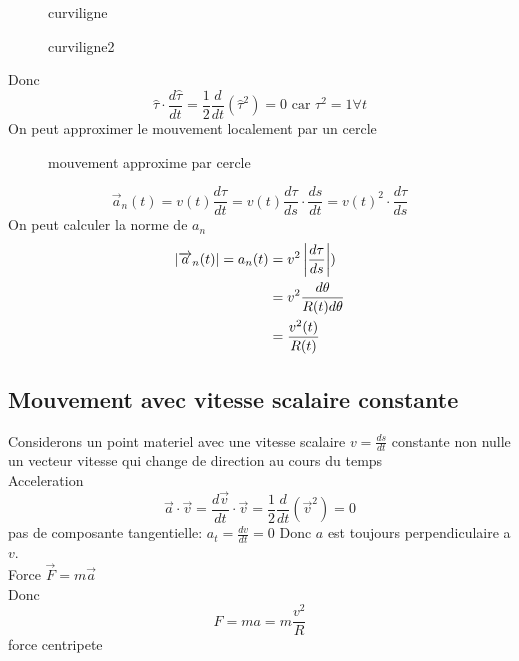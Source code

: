\documentclass[../main.tex]{subfiles}
\begin{document}
\begin{figure}[H]
    \centering
    \caption{curviligne}
    \label{fig:curviligne}
\end{figure}

\begin{figure}[H]
    \centering
    \caption{curviligne2}
    \label{fig:curviligne2}
\end{figure}

Donc 
\[ 
	\hat{\tau} \cdot \frac{d \hat{\tau}}{dt} = \frac{1}{2} \frac{d}{dt}( \hat{\tau}^{2}) = 0 \text{ car  } \tau ^{2} = 1 \forall t
\]
On peut approximer le mouvement localement par un cercle
\begin{figure}[H]
    \centering
    \caption{mouvement approxime par cercle}
    \label{fig:mouvement-approxime-par-cercle}
\end{figure}
\[ 
	\vec{a}_n(t) = v(t) \frac{d \tau}{dt} = v(t) \frac{d \tau}{ds} \cdot \frac{ds}{dt} = v(t)^{2} \cdot \frac{d \tau}{ds}
\]
On peut calculer la norme de $a_n$ 
\begin{align*}
	\left\vert\overrightarrow{a}_n ( t)\right\vert = a_n(t) &= v^{2} \left\vert \frac{d \tau}{ds}\right\vert )\\
				     &= v^{2} \frac{d \theta}{R(t) d \theta}\\
				     &= \frac{v^{2}(t)}{R(t)}
\end{align*}

\subsection{Mouvement avec vitesse scalaire constante}
Considerons un point materiel avec
une vitesse scalaire $v = \frac{ds}{dt}$ constante non nulle\\
un vecteur vitesse qui change de direction au cours du temps\\
Acceleration
\[ 
	\vec{a} \cdot \vec{v} = \frac{d \vec{v}}{dt} \cdot \vec{v} = \frac{1}{2} \frac{d}{dt}(\vec{v}^{2}) = 0
\]
pas de composante tangentielle: $a_t = \frac{dv}{dt} = 0$
Donc $a$ est toujours perpendiculaire a $v$.\\
Force $\vec{F} = m \vec{a}$\\
Donc 
\[ 
F = ma = m \frac{v^{2}}{R}
\]
force centripete
\end{document}
